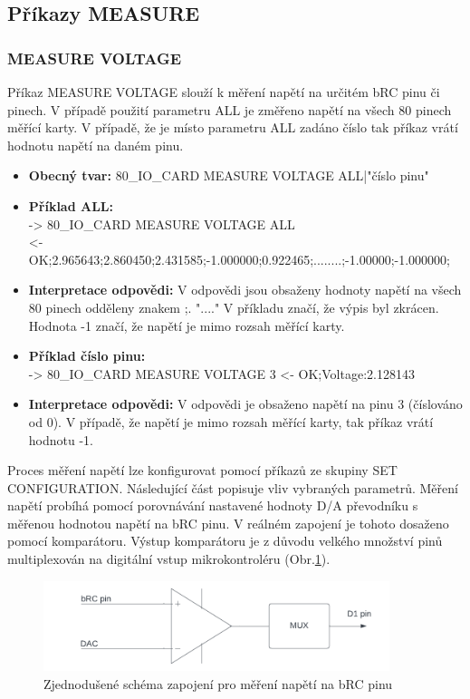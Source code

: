 \subsection{Příkazy MEASURE} \label{measure commands}
\subsubsection{MEASURE VOLTAGE}
Příkaz MEASURE VOLTAGE slouží k měření napětí na určitém bRC pinu či pinech. V případě použití parametru ALL je změřeno napětí na všech 80 pinech měřící karty.
V případě, že je místo parametru ALL zadáno číslo tak příkaz vrátí hodnotu napětí na daném pinu.\\

\begin{itemize}[leftmargin=*]
    \item \textbf{Obecný tvar:} 80\_IO\_CARD MEASURE VOLTAGE ALL|"číslo pinu"
    \item \textbf{Příklad ALL:}\\
    -> 80\_IO\_CARD MEASURE VOLTAGE ALL\\
    <- OK;2.965643;2.860450;2.431585;-1.000000;0.922465;........;-1.00000;-1.000000;
    \item \textbf{Interpretace odpovědi:} V odpovědi jsou obsaženy hodnoty napětí na všech 80 pinech odděleny znakem ;. "...." V příkladu značí, že výpis byl zkrácen.
    Hodnota -1 značí, že napětí je mimo rozsah měřící karty.

    \item \textbf{Příklad číslo pinu:}\\
    -> 80\_IO\_CARD MEASURE VOLTAGE 3
    <- OK;Voltage:2.128143\\
    \item \textbf{Interpretace odpovědi:} V odpovědi je obsaženo napětí na pinu 3 (číslováno od 0). V případě, že napětí je mimo rozsah měřící karty, tak příkaz vrátí hodnotu -1.
\end{itemize}

Proces měření napětí lze konfigurovat pomocí příkazů ze skupiny SET CONFIGURATION. Následující část popisuje vliv vybraných parametrů.
Měření napětí probíhá pomocí porovnávání nastavené hodnoty D/A převodníku s měřenou hodnotou napětí na bRC pinu. V reálném zapojení je tohoto dosaženo pomocí komparátoru.
Výstup komparátoru je z důvodu velkého množství pinů multiplexován na digitální vstup mikrokontroléru (Obr.\ref{fig: bRC pin voltage measurement}). 

\begin{figure}[ht!]
    \centering
    \includegraphics[width = 0.9\textwidth]{obrazky/Voltage_measurement_example.png}
    \caption{Zjednodušené schéma zapojení pro měření napětí na bRC pinu}
    \label{fig: bRC pin voltage measurement}
\end{figure}

